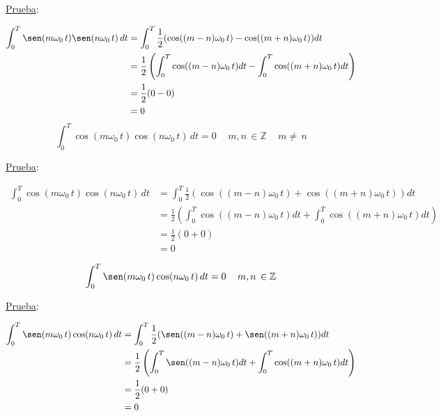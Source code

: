 \underline{Prueba}:

\begin{equation*}
\begin{split}
    \int_{0}^{T}\sen(m\omega_0\,t)\sen(n\omega_0\,t)\,dt
        &=\int_{0}^{T}\frac{1}{2}(\cos((m-n)\omega_0\,t)-
          \cos((m+n)\omega_0\,t))dt\\
        &=\frac{1}{2}\left(\int_{0}^{T}\cos((m-n)\omega_0\,t)dt-
          \int_{0}^{T}\cos((m+n)\omega_0\,t)dt\right)\\
        &=\frac{1}{2}(0-0)\\
        &=0\\
\end{split}
\end{equation*}
\begin{equation}
    \int_{0}^{T}\cos(m\omega_0\,t)\cos(n\omega_0\,t)\,dt=0
    \quad\,m,n\,\in\mathbb{Z}\quad\,m\neq\,n
\end{equation}

\underline{Prueba}:

\begin{equation*}
\begin{split}
    \int_{0}^{T}\cos(m\omega_0\,t)\cos(n\omega_0\,t)\,dt
        &=\int_{0}^{T}\frac{1}{2}(\cos((m-n)\omega_0\,t)+
          \cos((m+n)\omega_0\,t))dt\\
        &=\frac{1}{2}\left(\int_{0}^{T}\cos((m-n)\omega_0\,t)dt+
          \int_{0}^{T}\cos((m+n)\omega_0\,t)dt\right)\\
        &=\frac{1}{2}(0+0)\\
        &=0\\
\end{split}
\end{equation*}
\begin{equation}
    \int_{0}^{T}\sen(m\omega_0\,t)\cos(n\omega_0\,t)\,dt
    =0\quad\,m,n\,\in\mathbb{Z}
\end{equation}

\underline{Prueba}:

\begin{equation*}
\begin{split}
    \int_{0}^{T}\sen(m\omega_0\,t)\cos(n\omega_0\,t)\,dt
        &=\int_{0}^{T}\frac{1}{2}(\sen((m-n)\omega_0\,t)+
          \sen((m+n)\omega_0\,t))dt\\
        &=\frac{1}{2}\left(\int_{0}^{T}\sen((m-n)\omega_0\,t)dt+
          \int_{0}^{T}\cos((m+n)\omega_0\,t)dt\right)\\
        &=\frac{1}{2}(0+0)\\
        &=0\\
\end{split}
\end{equation*}

